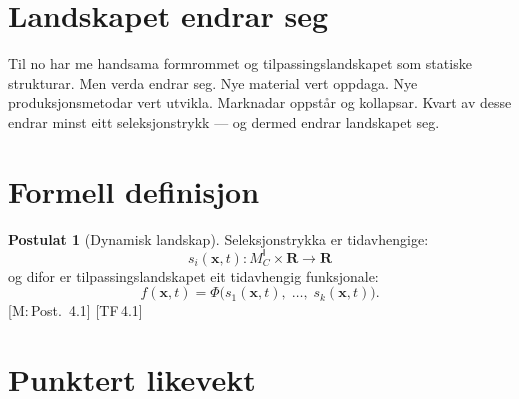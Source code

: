 \documentclass[10pt]{book}
\theoremstyle{definition}
\newtheorem{postulat}[definisjon]{Postulat}
\theoremstyle{plain}
\theoremstyle{remark}
\newcommand{\MC}{M^{\mathsf{I}}_C}
\providecommand{\R}{}
\renewcommand{\R}{\mathbf{R}}
\newcommand{\TF}[1]{\textnormal{[TF\,#1]}}
\newcommand{\Mref}[1]{\textnormal{[M:\,#1]}}
\begin{document}
\section{Landskapet endrar seg}\label{sec:dyn:intuisjon}

Til no har me handsama formrommet og tilpassingslandskapet som statiske strukturar. Men verda endrar seg. Nye material vert oppdaga. Nye produksjonsmetodar vert utvikla. Marknadar oppst\aa r og kollapsar. Kvart av desse endrar minst eitt seleksjonstrykk --- og dermed endrar landskapet seg.

\section{Formell definisjon}\label{sec:dyn:def}

\begin{postulat}[Dynamisk landskap]\label{post:dynamisk}
Seleksjonstrykka er tidavhengige:
\[
  s_i(\bm{x}, t) : \MC \times \R \longrightarrow \R
\]
og difor er tilpassingslandskapet eit tidavhengig funksjonale:
\[
  f(\bm{x}, t) = \Phi\bigl(s_1(\bm{x}, t),\; \ldots,\; s_k(\bm{x}, t)\bigr).
\]
\Mref{Post.~4.1} \TF{4.1}
\end{postulat}

\section{Punktert likevekt}\label{sec:dyn:punktert}
\end{document}
